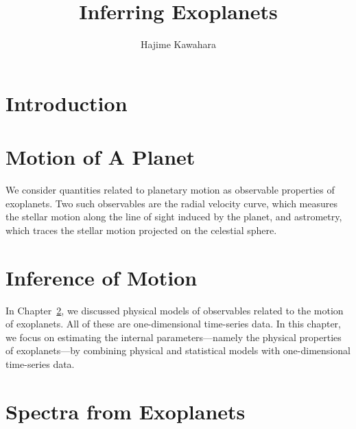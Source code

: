 \documentclass[a4paper,twocolumn]{report}
\begin{document}
\title{Inferring Exoplanets}
\author{Hajime Kawahara}
\maketitle

\tableofcontents

\chapter{Introduction}




\chapter{Motion of A Planet}\label{ch:motion}
We consider quantities related to planetary motion as observable properties of exoplanets. Two such observables are the radial velocity curve, which measures the stellar motion along the line of sight induced by the planet, and astrometry, which traces the stellar motion projected on the celestial sphere.




\chapter{Inference of Motion}\label{ch:infer}

In Chapter~\ref{ch:motion}, we discussed physical models of observables related to the motion of exoplanets. All of these are one-dimensional time-series data. In this chapter, we focus on estimating the internal parameters—namely the physical properties of exoplanets—by combining physical and statistical models with one-dimensional time-series data.





\chapter{Spectra from Exoplanets}
\end{document}
